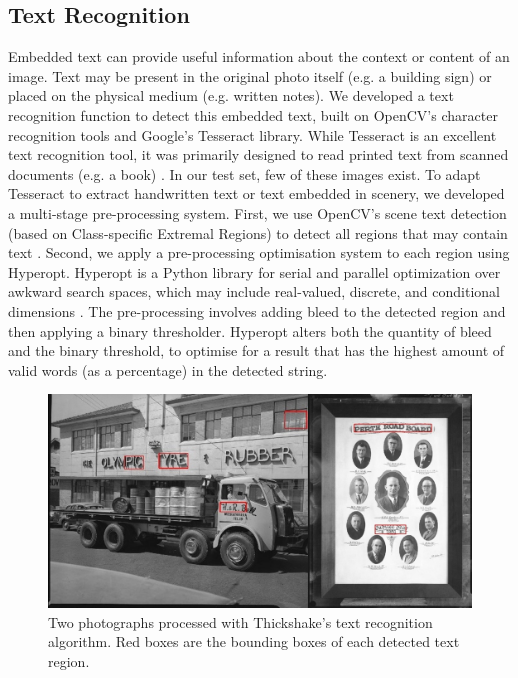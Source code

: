 \documentclass[10pt, a4paper]{article}
\begin{document}
\subsection{Text Recognition}
\label{subsection:image_processing:text_recognition}
Embedded text can provide useful information about the context or content of an image. Text may be present in the original photo itself (e.g. a building sign) or placed on the physical medium (e.g. written notes). We developed a text recognition function to detect this embedded text, built on OpenCV's character recognition tools and Google's Tesseract library. While Tesseract is an excellent text recognition tool, it was primarily designed to read printed text from scanned documents (e.g. a book) \cite{tesseract}. In our test set, few of these images exist. To adapt Tesseract to extract handwritten text or text embedded in scenery, we developed a multi-stage pre-processing system. First, we use OpenCV's scene text detection (based on Class-specific Extremal Regions) to detect all regions that may contain text \cite{opencv_text}. Second, we apply a pre-processing optimisation system to each region using Hyperopt. Hyperopt is a Python library for serial and parallel optimization over awkward search spaces, which may include real-valued, discrete, and conditional dimensions \cite{hyperopt}. The pre-processing involves adding bleed to the detected region and then applying a binary thresholder. Hyperopt alters both the quantity of bleed and the binary threshold, to optimise for a result that has the highest amount of valid words (as a percentage) in the detected string.

\begin{figure}[ht]
  \centering
  \includegraphics[width=\columnwidth]{figures/text_recognition.jpg}
  \caption{Two photographs processed with Thickshake's text recognition algorithm. Red boxes are the bounding boxes of each detected text region.}
  \label{figure:text_recognition:images}
\end{figure}
\end{document}
